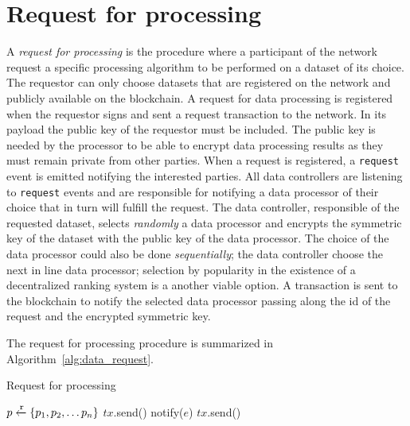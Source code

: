 \section{Request for processing}
\label{solution:flow:pr_req}

A \textit{request for processing} is the procedure where a participant of the network request a specific processing algorithm to be performed on a dataset of its choice. The requestor can only choose datasets that are registered on the network and publicly available on the blockchain. A request for data processing is registered when the requestor signs and sent a request transaction to the network. In its payload the public key of the requestor must be included. The public key is needed by the processor to be able to encrypt data processing results as they must remain private from other parties. When a request is registered, a \verb|request| event is emitted notifying the interested parties. All data controllers are listening to \verb|request| events and are responsible for notifying a data processor of their choice that in turn will fulfill the request. The data controller, responsible of the requested dataset, selects \textit{randomly} a data processor and encrypts the symmetric key of the dataset with the public key of the data processor. The choice of the data processor could also be done \textit{sequentially}; the data controller choose the next in line data processor; selection by popularity in the existence of a decentralized ranking system is a another viable option. A transaction is sent to the blockchain to notify the selected data processor passing along the id of the request and the encrypted symmetric key.

The request for processing procedure is summarized in Algorithm~\ref{alg:data_request}.

\begin{algorithm}[!htb]
  \caption{Request for processing}\label{alg:data_request}
  \begin{algorithmic}[1]
    \State $p \xleftarrow{\mathtt{r}} \{ p_1, p_2, \dots p_n \}$ 
     
     
     
    \State $tx$.send()
    \State {}
  \EndFunction
     
        \State notify($e$) 
      \EndIf
    \EndWhile
  \EndProcedure
     
    \State $tx$.send()
    \State {}
  \EndProcedure
  \end{algorithmic}
\end{algorithm}

